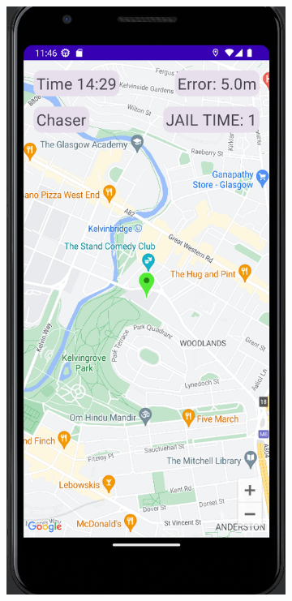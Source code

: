 \documentclass{l4proj}
\begin{document}
\begin{figure}
    \label{fig:ui_imp}
    \centering
    \begin{subfigure}[b]{0.45\textwidth}
        \includegraphics[width=\textwidth]{images/ui_chaser.png}

\end{subfigure}
\end{figure}
\end{document}
